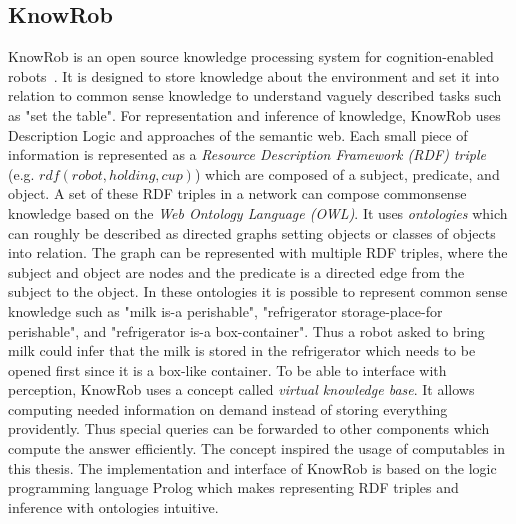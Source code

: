 \documentclass[a4paper,11pt]{article}
\begin{document}
\subsection{KnowRob}
\label{sec:knowrob}
KnowRob is an open source knowledge processing system for
cognition-enabled robots~\cite{KnowRob,KnowRob-Representation}. It is
designed to store knowledge about the environment and set it into
relation to common sense knowledge to understand vaguely described
tasks such as "set the table". For representation and inference of knowledge,
KnowRob uses Description Logic and approaches of the semantic web.
Each small piece of
information is represented as a \emph{Resource Description Framework
  (RDF) triple} (e.g. $rdf(robot, holding, cup)$) which are composed
of a subject, predicate, and object. A set of these RDF triples in a
network can compose commonsense knowledge based on the
\emph{Web Ontology Language (OWL)}. It uses
\emph{ontologies} which can roughly be described as directed graphs
setting objects or classes of objects into relation. The graph can be
represented with multiple RDF triples, where the subject and object
are nodes and the predicate is a directed edge from the subject to the
object. In these ontologies it is possible to represent common sense
knowledge such as "milk is-a perishable", "refrigerator
storage-place-for perishable", and "refrigerator is-a
box-container". Thus a robot asked to bring milk could infer that the
milk is stored in the refrigerator which needs to be opened first
since it is a box-like container. To be able to interface with
perception, KnowRob uses a concept called
\emph{virtual knowledge base}. It allows computing needed information
on demand instead of storing everything providently. Thus special
queries can be forwarded to other components which compute the answer
efficiently.
The concept inspired the usage of computables in this thesis.  The
implementation and interface of KnowRob is based on the logic
programming language Prolog which makes representing RDF triples and
inference with ontologies intuitive.
\end{document}
